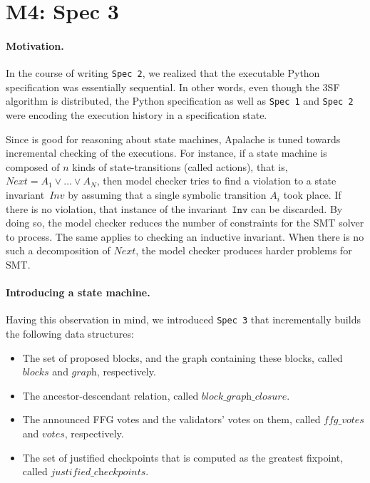 
\section{M4: Spec 3}

\paragraph{Motivation.} In the course of writing \texttt{Spec 2}, we realized
that the executable Python specification was essentially sequential. In other
words, even though the 3SF algorithm is distributed, the Python
specification as well as \texttt{Spec 1} and \texttt{Spec 2} were encoding the
execution history in a specification state.

Since \tlap{} is good for reasoning about state machines, Apalache is tuned
towards incremental checking of the executions. For instance, if a state
machine is composed of $n$ kinds of state-transitions (called actions), that
is, $\mathit{Next} = A_1 \vee \dots \vee A_N$, then model checker tries to find
a violation to a state invariant~$\textit{Inv}$ by assuming that a single
symbolic transition $A_i$ took place. If there is no violation, that instance
of the invariant~$\texttt{Inv}$ can be discarded. By doing so, the model
checker reduces the number of constraints for the SMT solver to process.  The
same applies to checking an inductive invariant. When there is no such a
decomposition of $\mathit{Next}$, the model checker produces harder
problems for SMT.

\paragraph{Introducing a state machine.} Having this observation in mind, we
introduced \texttt{Spec 3} that incrementally builds the following data structures:

\begin{itemize}

    \item The set of proposed blocks, and the graph containing these blocks,
        called $\textit{blocks}$ and $\textit{graph}$, respectively.

    \item The ancestor-descendant relation, called
        $\textit{block\_graph\_closure}$.

    \item The announced FFG votes and the validators' votes on them, called
        $\textit{ffg\_votes}$ and $\textit{votes}$, respectively.

    \item The set of justified checkpoints that is computed as the greatest
        fixpoint, called $\textit{justified\_checkpoints}$.

\end{itemize}

